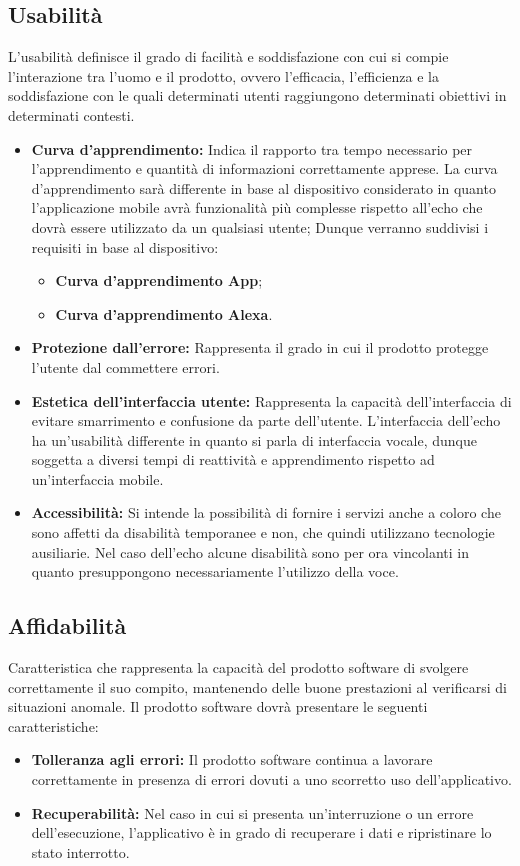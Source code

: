 \subsection{Usabilità}
L'usabilità definisce il grado di facilità e soddisfazione con cui si compie l'interazione tra l'uomo e il prodotto, ovvero l'efficacia, l'efficienza e la soddisfazione con le quali determinati utenti raggiungono determinati obiettivi in determinati contesti.
\begin{itemize}
	\item \textbf{Curva d'apprendimento:} Indica il rapporto tra tempo necessario per l'apprendimento e quantità di informazioni correttamente apprese.
	La curva d'apprendimento sarà differente in base al dispositivo considerato in quanto l'applicazione mobile avrà funzionalità più complesse rispetto all'echo che dovrà essere utilizzato da un qualsiasi utente;
	Dunque verranno suddivisi i requisiti in base al dispositivo:
	\begin{itemize}
		\item \textbf{Curva d'apprendimento App};
		\item \textbf{Curva d'apprendimento Alexa}.
	\end{itemize}
	\item \textbf{Protezione dall'errore:} Rappresenta il grado in cui il prodotto protegge l'utente dal commettere errori.
	\item \textbf{Estetica dell'interfaccia utente:} Rappresenta la capacità dell'interfaccia di evitare smarrimento e confusione da parte dell'utente.
	L'interfaccia dell'echo ha un'usabilità differente in quanto si parla di interfaccia vocale, dunque soggetta a diversi tempi di reattività e apprendimento rispetto ad un'interfaccia mobile.
	\item \textbf{Accessibilità:} Si intende la possibilità di fornire i servizi anche a coloro che sono affetti da disabilità temporanee e non, che quindi utilizzano tecnologie ausiliarie.
	Nel caso dell'echo alcune disabilità sono per ora vincolanti in quanto presuppongono necessariamente l'utilizzo della voce.
\end{itemize}
\subsection{Affidabilità}
Caratteristica che rappresenta la capacità del prodotto software di svolgere correttamente il suo compito, mantenendo delle buone prestazioni al verificarsi di situazioni anomale. 
Il prodotto software dovrà presentare le seguenti caratteristiche:
\begin{itemize}
	\item \textbf{Tolleranza agli errori:} Il prodotto software continua a lavorare correttamente in presenza di errori dovuti a uno scorretto uso dell'applicativo.
	\item \textbf{Recuperabilità:} Nel caso in cui si presenta un'interruzione  o un errore dell'esecuzione, l'applicativo è in grado di recuperare i dati e ripristinare lo stato interrotto.
\end{itemize}
